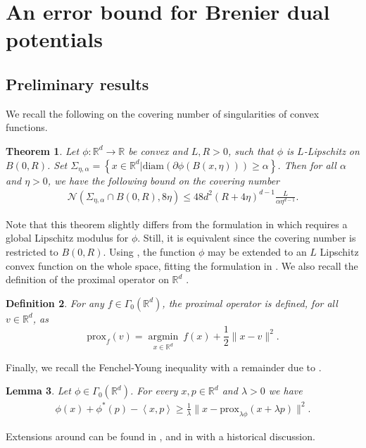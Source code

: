 \documentclass[11pt]{article}
\newtheorem{lemma}{Lemma}[section]
\newtheorem{definition}[lemma]{Definition}
\newtheorem{theorem}[lemma]{Theorem}
\DeclareMathOperator{\argmin}{argmin}
\newcommand{\R}{\mathbb R}
\newcommand{\RR}{\mathbb{R}}
\newcommand{\1}{\mathbbm{1}}
\newcommand{\prox}{\mathrm{prox}}
\numberwithin{equation}{section}
\begin{document}
\section{An error bound for Brenier dual potentials}
\label{sec:errorBound}

\subsection{Preliminary results}
\label{sec:preliminaryErrorBound}
We recall the following \cite[Theorem 2.1]{carlier2025quantitative} on the covering number of singularities of convex functions.

\begin{theorem}
	Let $\phi \colon \RR^d \to \RR$ be convex and $L,R > 0$, such that $\phi $ is $L$-Lipschitz on $B(0,R)$. Set $\Sigma_{\eta,\alpha} = \left\{ x \in \RR^d| \mathrm{diam} (\partial \phi(B(x,\eta))) \geq \alpha \right\}$.
	Then for all $\alpha$ and $\eta>0$,  we have the following bound on the covering number
	\begin{align*}
		\mathcal{N}( \Sigma_{\eta,\alpha} \cap B(0,R), 8\eta) \leq 48d^2 (R+4\eta)^{d-1} \frac{L}{\alpha \eta^{d-1}}.
	\end{align*}
	\label{th:coveringNumber}
\end{theorem}
Note that this theorem slightly differs from the formulation in \cite[Theorem 2.1]{carlier2025quantitative} which requires a global Lipschitz modulus for $\phi$. Still, it is equivalent since the covering number is restricted to $B(0,R)$. Using \cite{cobzas1978norm}, the function $\phi$ may be extended to an $L$ Lipschitz convex function on the whole space, fitting the formulation in \cite{carlier2025quantitative}.
We also recall the definition of the proximal operator on $\R^d$ \cite{moreau1965proximite}.
\begin{definition}
    For any $f\in \Gamma_0(\R^d)$, the proximal operator is defined, for all $v\in \R^d$, as
    \begin{equation*}
        \prox_f(v)=\underset{x\in\R^d}{\argmin} \ f(x)+\frac{1}{2}\|x-v\|^2.
    \end{equation*}
\end{definition}

Finally, we recall the Fenchel-Young inequality with a remainder due to \cite{carlier2023fenchel}. 
\begin{lemma}
	Let $\phi\in \Gamma_0(\R^d)$. For every $x,p\in \R^d$ and $\lambda>0$ we have
	\begin{align*}
		\phi(x) + \phi^*(p) - \left\langle x, p \right\rangle  \geq \frac{1}{\lambda}\|x - \mathrm{prox}_{\lambda \phi}(x + \lambda p)\|^2.
	\end{align*}
	\label{th:Carlier}
\end{lemma}
Extensions around  can be found in \cite{bauschke2022carlier}, \cite{burachik2025note} and in \cite{combettes2026lower} with a historical discussion.
\end{document}
